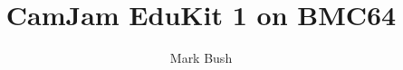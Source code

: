 \usepackage{forloop}



\setlength{\fboxsep}{0pt}
\newcommand\cbox[1]{\framebox[1.05em]{\rule{0pt}{.8em}\hspace*{.03em}#1}}

\newcommand\project[2]{%
\begin{tabular}{p{0.15\textwidth}p{0.8\textwidth}}
\textbf{Project} & #1 \\
\textbf{Description} & #2 \\
\end{tabular}
}
\newcommand\limage[2]{%
\begin{wrapfigure}{L}{#1\textwidth}
\centering
\texttt{[image: \#2]}
\end{wrapfigure}
}
\newcommand\rimage[2]{%
\begin{wrapfigure}{R}{#1\textwidth}
\centering
\texttt{[image: \#2]}
\end{wrapfigure}
}
\newcommand\explain[1]{%
\hfill\begin{minipage}[t]{0.9\textwidth}%
#1
\end{minipage}
}
\newcommand\ds{$\bullet$~}
\newcommand\dl{$\mathbf{-}$~}

\usepackage{hyperref}

\setcounter{tocdepth}{1}

\title{CamJam EduKit 1 on BMC64}
\author{Mark Bush}
\date{}
